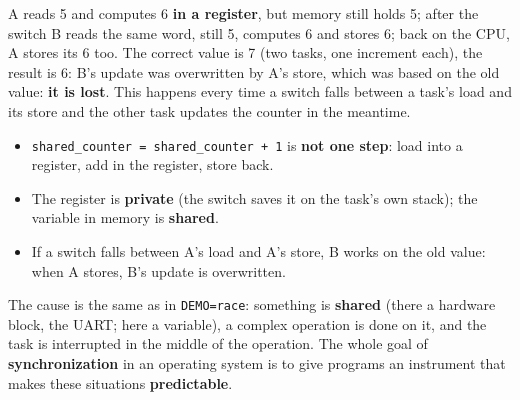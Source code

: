 A reads 5 and computes 6 \textbf{in a register}, but memory still holds 5; after the switch B reads the same word, still 5, computes 6 and stores 6; back on the CPU, A stores its 6 too. The correct value is 7 (two tasks, one increment each), the result is 6: B's update was overwritten by A's store, which was based on the old value: \textbf{it is lost}. This happens every time a switch falls between a task's load and its store and the other task updates the counter in the meantime.
\begin{itemize}
    \item \texttt{shared\_counter = shared\_counter + 1} is \textbf{not one step}: load into a register, add in the register, store back.
    \item The register is \textbf{private} (the switch saves it on the task's own stack); the variable in memory is \textbf{shared}.
    \item If a switch falls between A's load and A's store, B works on the old value: when A stores, B's update is overwritten.
\end{itemize}
The cause is the same as in \texttt{DEMO=race}: something is \textbf{shared} (there a hardware block, the UART; here a variable), a complex operation is done on it, and the task is interrupted in the middle of the operation. The whole goal of \textbf{synchronization} in an operating system is to give programs an instrument that makes these situations \textbf{predictable}.

